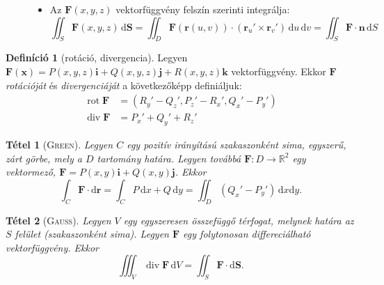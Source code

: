 \documentclass[DIV=15,appendixprefix]{scrreprt}
\newtheorem*{tetel}{Tétel}
\theoremstyle{definition}
\newtheorem*{defin}{Definíció}
\theoremstyle{remark}
\DeclareMathOperator{\rot}{rot}
\DeclareMathOperator{\diver}{div}
\begin{document}
\begin{description}
\begin{itemize}
\begin{equation*}
				\end{equation*}
			\item Az $ \mathbf{ F } \left( x,{} y,{} z \right) $ vektorfüggvény felszín szerinti
			integrálja:
				\begin{equation*}
					\iint_{ S } \mathbf{ F } \left( x,{} y,{} z \right) \, \mathrm{ d } \mathbf{ S }
					= \iint_{ D } \mathbf{ F } \left( \mathbf{ r } \left( u,{} v \right) \right)
					\cdot \left( \mathbf{r}_{ u }' \times \mathbf{r}_{ v }'\right) \, \mathrm{ d }
					u \, \mathrm{ d } v = \iint_{ S } \mathbf{ F } \cdot \mathbf{ n } \,
					\mathrm{ d } S
				\end{equation*}
		\end{itemize}
\end{description}
%
\begin{defin}[rotáció, divergencia]
	Legyen $ \mathbf{ F } \left( \mathbf{ x } \right) = P \left( x,{} y,{} z \right) \mathbf{ i } +
	Q \left( x,{} y,{} z \right) \mathbf{ j } + R \left( x,{} y,{} z \right) \mathbf{ k } $
	vektorfüggvény. Ekkor $ \mathbf{ F } $ \emph{rotációját} és \emph{divergenciáját} a
	következőképp definiáljuk:
	\begin{align}
		\rot \mathbf{ F } &= \left( R_{ y }' - Q_{ z }',{} P_{ z }' - R_{ x }', Q_{ x }' - P_{ y }'
		\right)\tag{vektorfüggvény}\\
		\diver \mathbf{ F } &= P_{ x }' + Q_{ y }' + R_{ z }'\tag{skalárfüggvény}
	\end{align}
\end{defin}
\begin{tetel}[\textsc{Green}]
	Legyen $ C $ egy pozitív irányítású szakaszonként sima, egyszerű, zárt görbe, mely a $ D $
	tartomány határa. Legyen továbbá $ \mathbf{F} \colon D \rightarrow
	\mathbb{ R }^{ 2 } $ egy vektormező, $ \mathbf{ F } = P \left( x,{} y \right) \mathbf{ i } + Q
	\left( x,{} y \right) \mathbf{ j } $. Ekkor
	\begin{equation*}
		\int_{ C } \mathbf{ F } \cdot \mathrm{ d } \mathbf{ r } = \int_{ C } P \, \mathrm{ d } x +
		Q \, \mathrm{ d } y = \iint_{ D } \left( Q_{ x }' - P_{ y }' \right) \, \mathrm{ d } x
		\mathrm{ d } y.
	\end{equation*}
\end{tetel}
\begin{tetel}[\textsc{Gauss}]
	Legyen $ V $ egy egyszeresen összefüggő térfogat, melynek határa az $ S $ felület (szakaszonként
	sima). Legyen $ \mathbf{ F } $ egy folytonosan differeciálható vektorfüggvény. Ekkor
	\begin{equation*}
		\iiint_{ V } \diver \mathbf{ F } \,\mathrm{ d } V = \iint_{ S } \mathbf{F} \cdot
		\mathrm{ d } \mathbf{ S }.
	\end{equation*}
\end{tetel}
\end{document}
